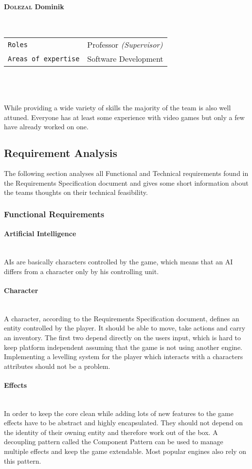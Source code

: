 \documentclass[11pt]{article}
\begin{document}
\paragraph{\textsc{Dolezal} Dominik} ~\\
\begin{tabular}{ll}
\texttt{Roles} & Professor \textit{\small{(Supervisor)}}\\
\texttt{Areas of expertise} & Software Development
\end{tabular}
\\
\\
\\
While providing a wide variety of skills the majority of the team is also well attuned. Everyone has at least some experience with video games but only a few have already worked on one.

\subsection{Requirement Analysis}
The following section analyses all Functional and Technical requirements found in the Requirements Specification document and gives some short information about the teams thoughts on their technical feasibility.

\subsubsection{Functional Requirements}
\paragraph{Artificial Intelligence}~\\
AIs are basically characters controlled by the game, which means that an AI differs from a character only by his controlling unit.
\paragraph{Character}~\\
A character, according to the Requirements Specification document, defines an entity controlled by the player.
It should be able to move, take actions and carry an inventory. The first two depend directly on the users input, which is hard to keep platform independent assuming that the game is not using another engine.
Implementing a levelling system for the player which interacts with a characters attributes should not be a problem.
\paragraph{Effects}~\\
In order to keep the core clean while adding lots of new features to the game effects have to be abstract and highly encapsulated. They should not depend on the identity of their owning entity and therefore work out of the box.
A decoupling pattern called the Component Pattern can be used to manage multiple effects and keep the game extendable. Most popular engines also rely on this pattern.
\end{document}
